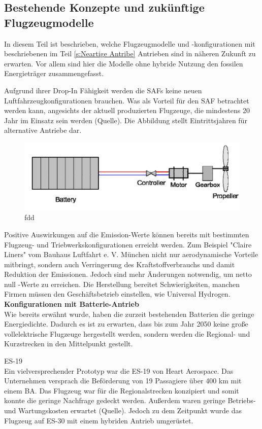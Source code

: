 \subsection{Bestehende Konzepte und zukünftige Flugzeugmodelle}
In diesem Teil ist beschrieben, welche Flugzeugmodelle und -konfigurationen mit beschriebenen im Teil \ref{s:Neartige Antribe} Antrieben
sind in näheren Zukunft zu erwarten. Vor allem sind hier die Modelle ohne hybride Nutzung den fossilen Energieträger zusammengefasst.

Aufgrund ihrer Drop-In Fähigkeit werden die SAFs keine neuen Luftfahrzeugkonfigurationen brauchen. Was als Vorteil für den SAF betrachtet werden kann,
angesichts der aktuell produzierten Flugzeuge, die mindestens 20 Jahr im Einsatz sein werden (Quelle).
Die Abbildung stellt Eintrittsjahren für alternative Antriebe dar.
%
\begin{figure}[h]
	\centering
	\includegraphics[width=0.9\linewidth]{Bilder/BA.png}
	\caption[Einfaches Modell eines Batterieantriebs]{fdd}
	\label{eis_antriebe}
\end{figure}
%
Positive Auswirkungen auf die Emission-Werte können bereits mit bestimmten Flugzeug- und Triebwerkskonfigurationen erreicht werden.
Zum Beispiel "Claire Liners" vom Bauhaus Luftfahrt e. V. München nicht nur aerodynamische Vorteile mitbringt, 
sondern auch Verringerung des Kraftstoffverbrauchs und damit Reduktion der Emissionen.
Jedoch sind mehr Änderungen notwendig, um netto null \cite{CO2}-Werte zu erreichen.
Die Herstellung bereitet Schwierigkeiten, manchen Firmen müssen den Geschäftsbetrieb einstellen, wie Universal Hydrogen.
\\
\textbf{Konfigurationen mit Batterie-Antrieb}\\
Wie bereits erwähnt wurde, haben die zurzeit bestehenden Batterien die geringe Energiedichte. Dadurch es ist zu erwarten, dass bis zum Jahr 
2050 keine große vollelektrische Flugzeuge hergestellt werden, sondern werden die Regional- und Kurzstrecken in den Mittelpunkt gestellt.

ES-19\\
Ein vielversprechender Prototyp war die ES-19 von Heart Aerospace. Das Unternehmen versprach die Beförderung von 19 Passagiere über 400 km mit einem BA. 
Das Flugzeug war für die Regionalstrecken konzipiert und somit konnte die geringe Nachfrage gedeckt werden. 
Außerdem waren geringe Betriebs- und Wartungskosten erwartet (Quelle).
Jedoch zu dem Zeitpunkt wurde das Flugzeug auf ES-30 mit einem hybriden Antrieb umgerüstet.


